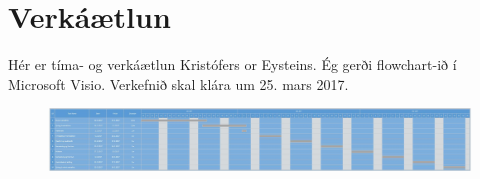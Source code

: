 \section{Verkáætlun}
Hér er tíma- og verkáætlun Kristófers or Eysteins. Ég gerði flowchart-ið í Microsoft Visio. Verkefnið skal klára um 25. mars 2017. 
\begin{figure}[h]
\includegraphics[scale=.3]{img/Timaogverkplan}
\end{figure}
